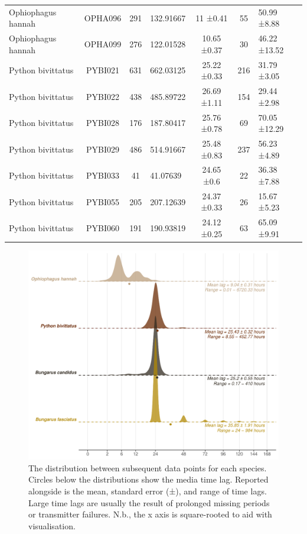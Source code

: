 \documentclass[10pt,a4paper]{article}
\begin{document}
\begin{table}
{\begin{tabular}[t]{lcclccl}
Ophiophagus hannah & OPHA096 & 291 & 132.91667 & 11 ±0.41 & 55 & 50.99 ±8.88\\
Ophiophagus hannah & OPHA099 & 276 & 122.01528 & 10.65 ±0.37 & 30 & 46.22 ±13.52\\
Python bivittatus & PYBI021 & 631 & 662.03125 & 25.22 ±0.33 & 216 & 31.79 ±3.05\\
Python bivittatus & PYBI022 & 438 & 485.89722 & 26.69 ±1.11 & 154 & 29.44 ±2.98\\
Python bivittatus & PYBI028 & 176 & 187.80417 & 25.76 ±0.78 & 69 & 70.05 ±12.29\\
Python bivittatus & PYBI029 & 486 & 514.91667 & 25.48 ±0.83 & 237 & 56.23 ±4.89\\
Python bivittatus & PYBI033 & 41 & 41.07639 & 24.65 ±0.6 & 22 & 36.38 ±7.88\\
Python bivittatus & PYBI055 & 205 & 207.12639 & 24.37 ±0.33 & 26 & 15.67 ±5.23\\
Python bivittatus & PYBI060 & 191 & 190.93819 & 24.12 ±0.25 & 63 & 65.09 ±9.91\\

\end{tabular}}
\end{table}

\begin{figure}
\includegraphics[width=1\linewidth]{../../figures/timeLagPlot} \caption{The distribution between subsequent data points for each species. Circles below the distributions show the media time lag. Reported alongside is the mean, standard error (±), and range of time lags. Large time lags are usually the result of prolonged missing periods or transmitter failures. N.b., the x axis is square-rooted to aid with visualisation.}\label{fig:timeLagPlot}
\end{figure}
\end{document}

